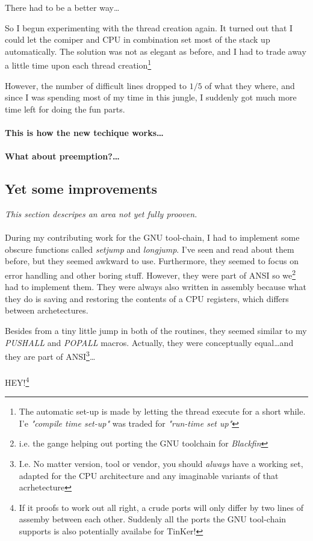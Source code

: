 {		There had to be a better way\ldots

		So I begun experimenting with the thread creation again. It turned out that I could let the comiper and CPU in combination set most of the stack up automatically. The solution was not as elegant as before, and I had to trade away a little time upon each thread creation\footnote{The automatic set-up is made by letting the thread execute for a short while. I'e \textit{"compile time set-up"} was traded for \textit{"run-time set up"} }

		However, the number of difficult lines dropped to $1/5$ of what they where, and since I was spending most of my time in this jungle, I suddenly got much more time left for doing the fun parts.

		\paragraph{This is how the new techique works\ldots} 

		\paragraph{What about preemption?\ldots} 

	\subsection{Yet some improvements}
	\textit{This section descripes an area not yet fully prooven.}\\\\
		During my contributing work for the GNU tool-chain, I had to implement some obscure functions called \textsl{setjump} and \textsl{longjump}. I've seen and read about them before, but they seemed awkward to use. Furthermore, they seemed to focus on error handling and other boring stuff. However, they were part of ANSI so we\footnote{i.e. the gange helping out porting the GNU toolchain for \textit{Blackfin}} had to implement them. They were always also written in assembly because what they do is saving and restoring the contents of a CPU registers, which differs between archetectures.

		Besides from a tiny little jump in both of the routines, they seemed similar to my \textit{PUSHALL} and \textit{POPALL} macros. Actually, they were conceptually equal\ldots and they are part of ANSI\footnote{I.e. No matter version, tool or vendor, you should \textit{always} have a working set, adapted for the CPU architecture and any imaginable variants of that acrhetecture}\ldots
		\\\\
		HEY!\footnote{If it proofs to work out all right, a crude ports will only differ by two lines of assemby between each other. Suddenly all the ports the GNU tool-chain supports is also potentially availabe for TinKer!}

}%

